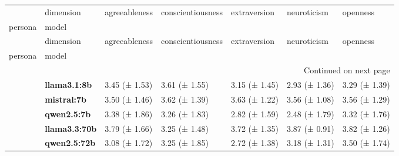 \begin{longtable}{lllllll}
\toprule
 & dimension & agreeableness & conscientiousness & extraversion & neuroticism & openness \\
persona & model &  &  &  &  &  \\
\midrule
\endfirsthead
\toprule
 & dimension & agreeableness & conscientiousness & extraversion & neuroticism & openness \\
persona & model &  &  &  &  &  \\
\midrule
\endhead
\midrule
\multicolumn{7}{r}{Continued on next page} \\
\midrule
\endfoot
\bottomrule
\endlastfoot
\multirow[t]{5}{*}{\textbf{base}} & \textbf{llama3.1:8b} & 3.45 (± 1.53) & 3.61 (± 1.55) & 3.15 (± 1.45) & 2.93 (± 1.36) & 3.29 (± 1.39) \\
\textbf{} & \textbf{mistral:7b} & 3.50 (± 1.46) & 3.62 (± 1.39) & 3.63 (± 1.22) & 3.56 (± 1.08) & 3.56 (± 1.29) \\
\textbf{} & \textbf{qwen2.5:7b} & 3.38 (± 1.86) & 3.26 (± 1.83) & 2.82 (± 1.59) & 2.48 (± 1.79) & 3.32 (± 1.76) \\
\textbf{} & \textbf{llama3.3:70b} & 3.79 (± 1.66) & 3.25 (± 1.48) & 3.72 (± 1.35) & 3.87 (± 0.91) & 3.82 (± 1.26) \\
\textbf{} & \textbf{qwen2.5:72b} & 3.08 (± 1.72) & 3.25 (± 1.85) & 2.72 (± 1.38) & 3.18 (± 1.31) & 3.50 (± 1.74) \\
\cline{1-7}
\end{longtable}
